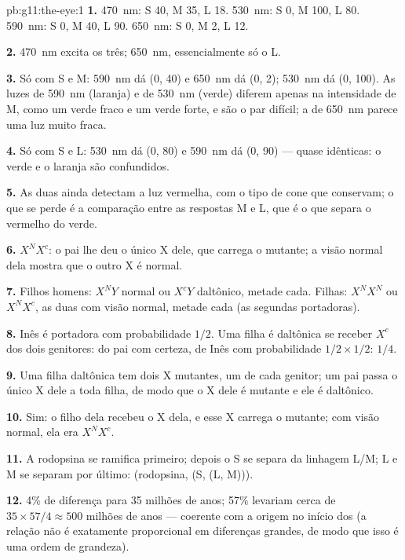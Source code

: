 \begin{solution}{pb:g11:the-eye:1}
\textbf{1.} \qty{470}{nm}: S 40, M 35, L 18. \qty{530}{nm}: S 0, M 100,
L 80. \qty{590}{nm}: S 0, M 40, L 90. \qty{650}{nm}: S 0, M 2, L 12.

\textbf{2.} \qty{470}{nm} excita os três; \qty{650}{nm}, essencialmente
só o L.

\textbf{3.} Só com S e M: \qty{590}{nm} dá (0, 40) e \qty{650}{nm} dá
(0, 2); \qty{530}{nm} dá (0, 100). As luzes de \qty{590}{nm} (laranja)
e de \qty{530}{nm} (verde) diferem apenas na intensidade de M, como um
verde fraco e um verde forte, e são o par difícil; a de \qty{650}{nm}
parece uma luz muito fraca.

\textbf{4.} Só com S e L: \qty{530}{nm} dá (0, 80) e \qty{590}{nm} dá
(0, 90) --- quase idênticas: o verde e o laranja são confundidos.

\textbf{5.} As duas ainda detectam a luz vermelha, com o tipo de cone
que conservam; o que se perde é a comparação entre as respostas M e L,
que é o que separa o vermelho do verde.

\textbf{6.} $X^NX^c$: o pai lhe deu o único X dele, que carrega o 
mutante; a visão normal dela mostra que o outro X é normal.

\textbf{7.} Filhos homens: $X^NY$ normal ou $X^cY$ daltônico, metade
cada. Filhas: $X^NX^N$ ou $X^NX^c$, as duas com visão normal, metade
cada (as segundas portadoras).

\textbf{8.} Inês é portadora com probabilidade $1/2$. Uma filha é
daltônica se receber $X^c$ dos dois genitores: do pai com certeza, de
Inês com probabilidade $1/2 \times 1/2$: $1/4$.

\textbf{9.} Uma filha daltônica tem dois  X mutantes, um de
cada genitor; um pai passa o único X dele a toda filha, de modo que o X
dele é mutante e ele é daltônico.

\textbf{10.} Sim: o filho dela recebeu o X dela, e esse X carrega o
 mutante; com visão normal, ela era $X^NX^c$.

\textbf{11.} A rodopsina se ramifica primeiro; depois o S se separa da
linhagem L/M; L e M se separam por último: (rodopsina, (S, (L, M))).

\textbf{12.} 4\% de diferença para 35 milhões de anos; 57\% levariam
cerca de $35 \times 57/4 \approx 500$ milhões de anos --- coerente com
a origem no início dos  (a relação não é exatamente
proporcional em diferenças grandes, de modo que isso é uma ordem de
grandeza).


\end{solution}

